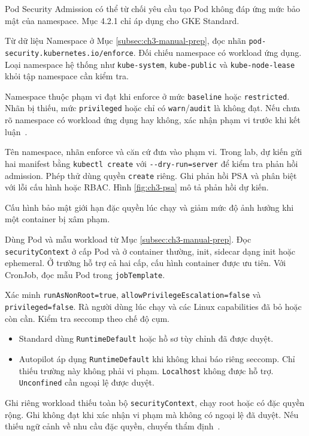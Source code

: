 Pod Security Admission có thể từ chối yêu cầu tạo Pod không đáp ứng mức bảo mật của namespace. Mục 4.2.1 chỉ áp dụng cho GKE Standard.

Từ dữ liệu Namespace ở Mục \ref{subsec:ch3-manual-prep}, đọc nhãn \texttt{pod-security.kubernetes.io/enforce}. Đối chiếu namespace có workload ứng dụng. Loại namespace hệ thống như \texttt{kube-system}, \texttt{kube-public} và \texttt{kube-node-lease} khỏi tập namespace cần kiểm tra.

Namespace thuộc phạm vi đạt khi enforce ở mức \texttt{baseline} hoặc \texttt{restricted}. Nhãn bị thiếu, mức \texttt{privileged} hoặc chỉ có \texttt{warn}/\texttt{audit} là không đạt. Nếu chưa rõ namespace có workload ứng dụng hay không, xác nhận phạm vi trước khi kết luận~\mbox{}.

Tên namespace, nhãn enforce và căn cứ đưa vào phạm vi. Trong lab, dự kiến gửi hai manifest bằng \texttt{kubectl create} với \texttt{-{}-dry-run=server} để kiểm tra phản hồi admission. Phép thử dùng quyền \texttt{create} riêng. Ghi phản hồi PSA và phân biệt với lỗi cấu hình hoặc RBAC. Hình \ref{fig:ch3-psa} mô tả phản hồi dự kiến.


Cấu hình bảo mật giới hạn đặc quyền lúc chạy và giảm mức độ ảnh hưởng khi một container bị xâm phạm.

Dùng Pod và mẫu workload từ Mục \ref{subsec:ch3-manual-prep}. Đọc \texttt{securityContext} ở cấp Pod và ở container thường, init, sidecar dạng init hoặc ephemeral. Ở trường hỗ trợ cả hai cấp, cấu hình container được ưu tiên. Với CronJob, đọc mẫu Pod trong \texttt{jobTemplate}.

Xác minh \texttt{runAsNonRoot=true}, \texttt{allowPrivilegeEscalation=false} và \texttt{privileged=false}. Rà người dùng lúc chạy và các Linux capabilities đã bỏ hoặc còn cần. Kiểm tra seccomp theo chế độ cụm.
\begin{itemize}[leftmargin=1.1cm,itemsep=0pt,topsep=3pt]
  \item Standard dùng \texttt{RuntimeDefault} hoặc hồ sơ tùy chỉnh đã được duyệt.
  \item Autopilot áp dụng \texttt{RuntimeDefault} khi không khai báo riêng seccomp. Chỉ thiếu trường này không phải vi phạm. \texttt{Localhost} không được hỗ trợ. \texttt{Unconfined} cần ngoại lệ được duyệt.
\end{itemize}
Ghi riêng workload thiếu toàn bộ \texttt{securityContext}, chạy root hoặc có đặc quyền rộng. Ghi không đạt khi xác nhận vi phạm mà không có ngoại lệ đã duyệt. Nếu thiếu ngữ cảnh về nhu cầu đặc quyền, chuyển thẩm định~\mbox{\parencites[tr.~89--90]{cis-gke-standard-v2}[tr.~63--64]{cis-gke-autopilot-v2}}.

